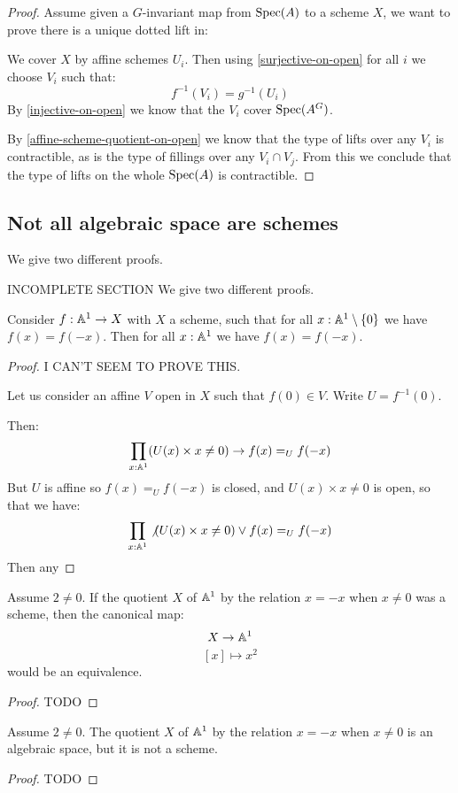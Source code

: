 \begin{proof}
Assume given a $G$-invariant map from $\operatorname{Spec}(A)$ to a scheme $X$, we want to prove there is a unique dotted lift in:
\begin{center}
\end{center}
We cover $X$ by affine schemes $U_i$. Then using \cref{surjective-on-open} for all $i$ we choose $V_i$ such that:
\[f^{-1}(V_i) = g^{-1}(U_i)\]
By \cref{injective-on-open} we know that the $V_i$ cover $\operatorname{Spec}(A^G)$. 

By \cref{affine-scheme-quotient-on-open} we know that the type of lifts over any $V_i$ is contractible, as is the type of fillings over any $V_i\cap V_j$. From this we conclude that the type of lifts on the whole $\operatorname{Spec}(A)$ is contractible.
\end{proof}

\subsection{Not all algebraic space are schemes}

We give two different proofs.

INCOMPLETE SECTION We give two different proofs.

\begin{lemma}
Consider $f:\mathbb{A}^1\to X$ with $X$ a scheme, such that for all $x:\mathbb{A}^1\setminus\{0\}$ we have $f(x)=f(-x)$. Then for all $x:\mathbb{A}^1$ we have $f(x)=f(-x)$.
\end{lemma}

\begin{proof}
I CAN'T SEEM TO PROVE THIS.

Let us consider an affine $V$ open in $X$ such that $f(0)\in V$. Write $U=f^{-1}(0)$. 

Then:
\[\prod_{x:\mathbb{A}^1} (U(x)\times x\not=0) \to f(x)=_Uf(-x)\]
But $U$ is affine so $f(x)=_Uf(-x)$ is closed, and $U(x)\times x\not=0$ is open, so that we have:
\[\prod_{x:\mathbb{A}^1} \not(U(x)\times x\not=0) \lor f(x)=_Uf(-x)\]
Then any 
\end{proof}

\begin{corollary}
Assume $2\not=0$. If the quotient $X$ of $\mathbb{A}^1$ by the relation $x=-x$ when $x\not=0$ was a scheme, then the canonical map:
\[X\to \mathbb{A}^1\]
\[[x]\mapsto x^2\]
would be an equivalence.
\end{corollary}

\begin{proof}
TODO
\end{proof}

\begin{proposition}
Assume $2\not=0$. The quotient $X$ of $\mathbb{A}^1$ by the relation $x=-x$ when $x\not=0$ is an algebraic space, but it is not a scheme.
\end{proposition}

\begin{proof}
TODO
\end{proof}

